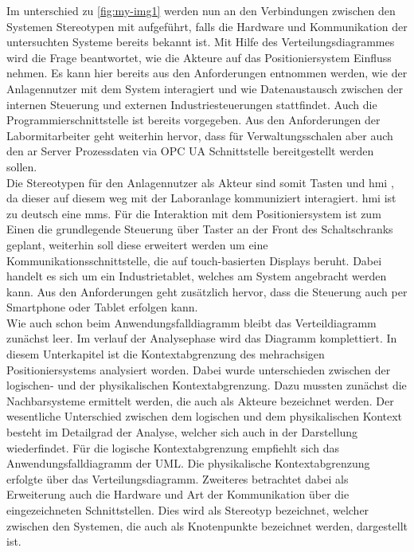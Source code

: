 \documentclass[../../../Bachelorarbeit.tex]{subfiles}
\begin{document}
Im unterschied zu \autoref{fig:my-img1} werden nun an den Verbindungen zwischen den Systemen Stereotypen mit aufgeführt, falls die Hardware und Kommunikation der untersuchten Systeme bereits bekannt ist. Mit Hilfe des Verteilungsdiagrammes wird die Frage beantwortet, wie die Akteure auf das Positioniersystem Einfluss nehmen. Es kann hier bereits aus den Anforderungen entnommen werden, wie der Anlagennutzer mit dem System interagiert und wie Datenaustausch zwischen der internen Steuerung und externen Industriesteuerungen stattfindet. Auch die Programmierschnittstelle ist bereits vorgegeben. Aus den Anforderungen der Labormitarbeiter geht weiterhin hervor, dass für Verwaltungsschalen aber auch den \ac{ar} Server Prozessdaten via OPC UA Schnittstelle bereitgestellt werden sollen.\\
Die Stereotypen für \zB den Anlagennutzer als Akteur sind somit \glqq Tasten\grqq{} und \glqq \acs{hmi} \grqq{}, da dieser auf diesem weg mit der Laboranlage kommuniziert \bzw interagiert. \ac{hmi} ist zu deutsch eine \ac{mms}. Für die Interaktion mit dem Positioniersystem ist zum Einen die grundlegende Steuerung über Taster an der Front des Schaltschranks geplant, weiterhin soll diese erweitert werden um eine Kommunikationsschnittstelle, die auf touch-basierten Displays beruht. Dabei handelt es sich um ein Industrietablet, welches am System angebracht werden kann. Aus den Anforderungen geht zusätzlich hervor, dass die Steuerung auch per Smartphone oder Tablet erfolgen kann.\\
Wie auch schon beim Anwendungsfalldiagramm bleibt das Verteildiagramm zunächst leer. Im verlauf der Analysephase wird das Diagramm komplettiert.
\bigskip
\newline
In diesem Unterkapitel ist die Kontextabgrenzung des mehrachsigen Positioniersystems analysiert worden. Dabei wurde unterschieden zwischen der logischen- und der physikalischen Kontextabgrenzung. Dazu mussten zunächst die Nachbarsysteme ermittelt werden, die auch als Akteure bezeichnet werden. Der wesentliche Unterschied zwischen dem logischen und dem physikalischen Kontext besteht im Detailgrad der Analyse, welcher sich auch in der Darstellung wiederfindet. Für die logische Kontextabgrenzung empfiehlt sich das Anwendungsfalldiagramm der UML. Die physikalische Kontextabgrenzung erfolgte über das Verteilungsdiagramm. Zweiteres betrachtet dabei als Erweiterung auch die Hardware und Art der Kommunikation über die eingezeichneten Schnittstellen. Dies wird als Stereotyp bezeichnet, welcher zwischen den Systemen, die auch als Knotenpunkte bezeichnet werden, dargestellt ist.
\end{document}
